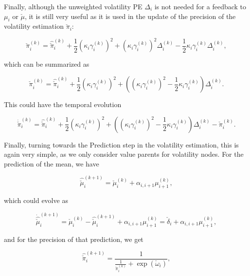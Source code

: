 Finally, although the unweighted volatility PE $\Delta_i$ is not needed for a feedback to $\mu_i$ or $\check{\mu}$, it is still very useful as it is used in the update of the precision of the volatility estimation $\check{\pi}_i$:

\begin{equation}
	\check{\pi}_i^{(k)} = \hat{\check{\pi}}_i^{(k)} + \frac{1}{2} (\kappa_i \gamma_i^{(k)})^2 + (\kappa_i \gamma_i^{(k)})^2 \Delta_i^{(k)} - \frac{1}{2} \kappa_i \gamma_i^{(k)} \Delta_i^{(k)}, 
\end{equation}

which can be summarized as 

\begin{equation}
	\check{\pi}_i^{(k)} = \hat{\check{\pi}}_i^{(k)} + \frac{1}{2} (\kappa_i \gamma_i^{(k)})^2 + ((\kappa_i \gamma_i^{(k)})^2 - \frac{1}{2} \kappa_i \gamma_i^{(k)}) \Delta_i^{(k)}.
\end{equation}

This could have the temporal evolution

\begin{equation}
	\dot{\check{\pi}}_i^{(k)} = \hat{\check{\pi}}_i^{(k)} + \frac{1}{2} (\kappa_i \gamma_i^{(k)})^2 + ((\kappa_i \gamma_i^{(k)})^2 - \frac{1}{2} \kappa_i \gamma_i^{(k)}) \Delta_i^{(k)} - \check{\pi}_i^{(k)}.
\end{equation}

Finally, turning towards the \textsf{Prediction} step in the volatility estimation, this is again very simple, as we only consider value parents for volatility nodes. For the prediction of the mean, we have

\begin{equation}
	\hat{\check{\mu}}_i^{(k+1)} = \check{\mu}_i^{(k)} + \alpha_{i,i+1} \mu_{i+1}^{(k)}, 
\end{equation}

which could evolve as 

\begin{equation}
	\dot{\hat{\check{\mu}}}_i^{(k+1)} = \check{\mu}_i^{(k)} - \hat{\check{\mu}}_i^{(k+1)} + \alpha_{i,i+1} \mu_{i+1}^{(k)} = \check{\delta}_i + \alpha_{i,i+1} \mu_{i+1}^{(k)}, 
\end{equation}

and for the precision of that prediction, we get

\begin{equation}
  \hat{\check{\pi}}_i^{(k+1)} = \frac{1}{\frac{1}{\check{\pi}_i^{(k)}} + \exp(\check{\omega}_i)}, 
\end{equation}

